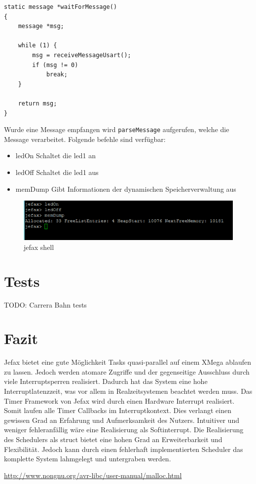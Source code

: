 \documentclass[fontsize=12pt, toc=bibliography, notitlepage]{scrreprt}
\begin{document}
\begin{lstlisting}
static message *waitForMessage()
{
    message *msg;

    while (1) {
        msg = receiveMessageUsart();
        if (msg != 0)
            break;
    }

    return msg;
}
\end{lstlisting}

Wurde eine Message empfangen wird \lstinline$parseMessage$ aufgerufen, welche die Message verarbeitet. Folgende befehle sind verfügbar:

\begin{itemize}
	\item ledOn Schaltet die led1 an
	\item ledOff Schaltet die led1 aus
	\item memDump Gibt Informationen der dynamischen Speicherverwaltung aus
\end{itemize}

\begin{figure}[H]
	\centering
	\includegraphics[width=450px]{images/shell.png}
	\caption{jefax shell}
	\label{fig:shell}
\end{figure}

\chapter{Tests}
\label{chap:tests}
TODO: Carrera Bahn tests

\chapter{Fazit}
\label{chap:fazit}
Jefax bietet eine gute Möglichkeit Tasks quasi-parallel auf einem XMega ablaufen zu lassen. Jedoch werden atomare Zugriffe und der gegenseitige Ausschluss durch viele Interruptsperren realisiert. Dadurch hat das System eine hohe Interruptlatenzzeit, was vor allem in Realzeitsystemen beachtet werden muss.
Das Timer Framework von Jefax wird durch einen Hardware Interrupt realisiert. Somit laufen alle Timer Callbacks im Interruptkontext. Dies verlangt einen gewissen Grad an Erfahrung und Aufmerksamkeit des Nutzers. Intuitiver und weniger fehleranfällig wäre eine Realisierung als Softinterrupt.
Die Realisierung des Schedulers als struct bietet eine hohen Grad an Erweiterbarkeit und Flexibilität. Jedoch kann durch einen fehlerhaft implementierten Scheduler das komplette System lahmgelegt und untergraben werden.

\begin{thebibliography}{999}
 \url{http://www.nongnu.org/avr-libc/user-manual/malloc.html}
\end{thebibliography}

\cleardoublepage
{}
\listoffigures
\end{document}
